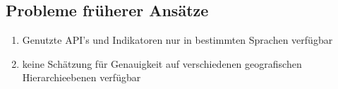 		\subsection{Probleme früherer Ansätze}
			\begin{enumerate}
				\item{Genutzte API's und Indikatoren nur in bestimmten Sprachen verfügbar}
				\item{keine Schätzung für Genauigkeit auf verschiedenen geografischen Hierarchieebenen verfügbar}  
			\end{enumerate}

	
	
	

	
